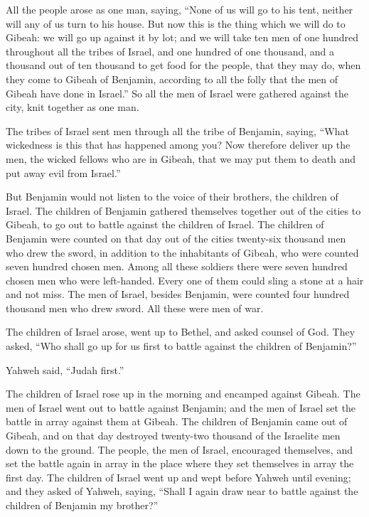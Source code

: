  All the people arose as one man, saying, ``None of us will
go to his tent, neither will any of us turn to his house. 
But now this is the thing which we will do to Gibeah: we will go up
against it by lot;  and we will take ten men of one hundred
throughout all the tribes of Israel, and one hundred of one thousand,
and a thousand out of ten thousand to get food for the people, that they
may do, when they come to Gibeah of Benjamin, according to all the folly
that the men of Gibeah have done in Israel.''  So all the
men of Israel were gathered against the city, knit together as one man.

 The tribes of Israel sent men through all the tribe of
Benjamin, saying, ``What wickedness is this that has happened among you?
 Now therefore deliver up the men, the wicked fellows who
are in Gibeah, that we may put them to death and put away evil from
Israel.''

But Benjamin would not listen to the voice of their brothers, the
children of Israel.  The children of Benjamin gathered
themselves together out of the cities to Gibeah, to go out to battle
against the children of Israel.  The children of Benjamin
were counted on that day out of the cities twenty-six thousand men who
drew the sword, in addition to the inhabitants of Gibeah, who were
counted seven hundred chosen men.  Among all these soldiers
there were seven hundred chosen men who were left-handed. Every one of
them could sling a stone at a hair and not miss.  The men
of Israel, besides Benjamin, were counted four hundred thousand men who
drew sword. All these were men of war.

 The children of Israel arose, went up to Bethel, and asked
counsel of God. They asked, ``Who shall go up for us first to battle
against the children of Benjamin?''

Yahweh said, ``Judah first.''

 The children of Israel rose up in the morning and encamped
against Gibeah.  The men of Israel went out to battle
against Benjamin; and the men of Israel set the battle in array against
them at Gibeah.  The children of Benjamin came out of
Gibeah, and on that day destroyed twenty-two thousand of the Israelite
men down to the ground.  The people, the men of Israel,
encouraged themselves, and set the battle again in array in the place
where they set themselves in array the first day.  The
children of Israel went up and wept before Yahweh until evening; and
they asked of Yahweh, saying, ``Shall I again draw near to battle
against the children of Benjamin my brother?''

